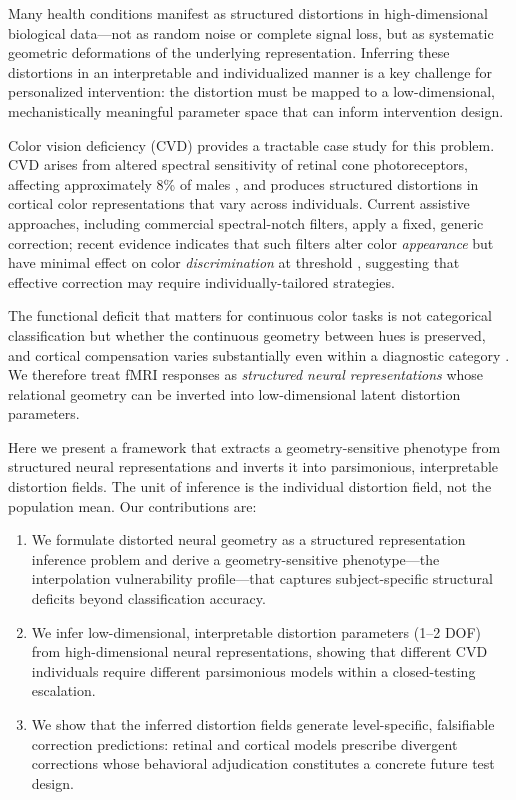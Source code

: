 \documentclass{article}
\begin{document}
Many health conditions manifest as structured distortions in high-dimensional biological data---not as random noise or complete signal loss, but as systematic geometric deformations of the underlying representation.
Inferring these distortions in an interpretable and individualized manner is a key challenge for personalized intervention: the distortion must be mapped to a low-dimensional, mechanistically meaningful parameter space that can inform intervention design.

Color vision deficiency (CVD) provides a tractable case study for this problem.
CVD arises from altered spectral sensitivity of retinal cone photoreceptors, affecting approximately 8\% of males \citep{machado2009}, and produces structured distortions in cortical color representations that vary across individuals.
Current assistive approaches, including commercial spectral-notch filters, apply a fixed, generic correction; recent evidence indicates that such filters alter color \emph{appearance} but have minimal effect on color \emph{discrimination} at threshold \citep{somers2024}, suggesting that effective correction may require individually-tailored strategies.

The functional deficit that matters for continuous color tasks is not categorical classification but whether the continuous geometry between hues is preserved, and cortical compensation varies substantially even within a diagnostic category \citep{tregillus2021}.
We therefore treat fMRI responses as \emph{structured neural representations} whose relational geometry can be inverted into low-dimensional latent distortion parameters.

Here we present a framework that extracts a geometry-sensitive phenotype from structured neural representations and inverts it into parsimonious, interpretable distortion fields.
The unit of inference is the individual distortion field, not the population mean.
Our contributions are:
\begin{enumerate}
    \item We formulate distorted neural geometry as a structured representation inference problem and derive a geometry-sensitive phenotype---the interpolation vulnerability profile---that captures subject-specific structural deficits beyond classification accuracy.
    \item We infer low-dimensional, interpretable distortion parameters (1--2 DOF) from high-dimensional neural representations, showing that different CVD individuals require different parsimonious models within a closed-testing escalation.
    \item We show that the inferred distortion fields generate level-specific, falsifiable correction predictions: retinal and cortical models prescribe divergent corrections whose behavioral adjudication constitutes a concrete future test design.
\end{enumerate}
\end{document}
